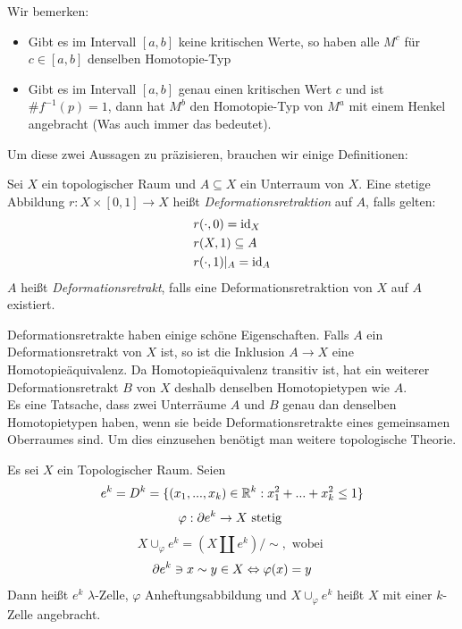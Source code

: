 Wir bemerken: 
\begin{itemize}
    \item Gibt es im Intervall $[a, b]$ keine kritischen Werte, so haben alle
        $M^c$ für $c \in [a, b]$ denselben Homotopie-Typ
    \item Gibt es im Intervall $[a, b]$ genau einen kritischen Wert $c$ und ist
        $ \#f^{-1}(p) = 1$, dann hat $M^b$ den Homotopie-Typ von $M^a$ mit einem 
        Henkel angebracht (Was auch immer das bedeutet).
\end{itemize}

Um diese zwei Aussagen zu präzisieren, brauchen wir einige Definitionen:

\begin{definition}[Deformationsretrakt]
    Sei $X$ ein topologischer Raum und $A \subseteq X$ ein Unterraum von $X$.
    Eine stetige Abbildung $r: X \times [0, 1] \rightarrow X$ heißt 
    \textit{Deformationsretraktion} auf $A$, falls gelten:
    \begin{align*}
        & r(\cdot, 0) = { \operatorname{id} }_X \\
        & r(X, 1) \subseteq A \\
        & r(\cdot, 1)|_A = { \operatorname{id} }_A \\
    \end{align*}
    $A$ heißt \textit{Deformationsretrakt}, falls eine Deformationsretraktion
    von $X$ auf $A$ existiert.
\end{definition}

Deformationsretrakte haben einige schöne Eigenschaften. Falls $A$ ein
Deformationsretrakt von $X$ ist, so ist die Inklusion $A \rightarrow X$ eine
Homotopieäquivalenz. Da Homotopieäquivalenz transitiv ist, hat ein weiterer
Deformationsretrakt $B$ von $X$ deshalb denselben Homotopietypen wie $A$. \\
Es eine Tatsache, dass zwei Unterräume $A$ und $B$ genau dan denselben 
Homotopietypen haben, wenn sie beide Deformationsretrakte eines gemeinsamen 
Oberraumes sind. Um dies einzusehen benötigt man weitere topologische 
Theorie.

\begin{definition}
    Es sei $X$ ein Topologischer Raum. Seien
    \[ e^k = D^k = \{(x_1, ..., x_k) \in { \mathbb R }^k: x_1^2 + ... + x_k^2 \leq 1\} \]
    \[ \varphi: { \partial } e^k \rightarrow X \text{ stetig } \]
    \[ X \cup_{\varphi} e^k = (X \amalg e^k) / \sim, \text{ wobei } \]
    \[ { \partial } e^k \ni x \sim y \in X \Leftrightarrow \varphi(x) = y \]
    Dann heißt $e^k$ $\lambda$-Zelle, $\varphi$ Anheftungsabbildung 
    und $X \cup_{\varphi} e^k$ heißt $X$ mit einer $k$-Zelle 
    angebracht.
\end{definition}

